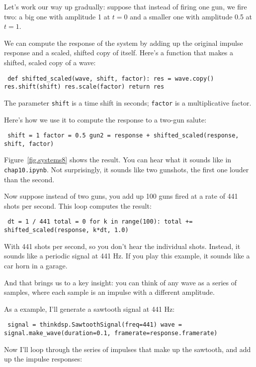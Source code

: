 \documentclass[12pt]{book} \usepackage[width=5.5in,height=8.5in, hmarginratio=3:2,vmarginratio=1:1]{geometry}
\begin{document}
Let's work our way up gradually: suppose that instead of firing one gun, we fire two: a big one with amplitude 1 at $t=0$ and a smaller one with amplitude 0.5 at $t=1$. 

We can compute the response of the system by adding up the original impulse response and a scaled, shifted copy of itself. Here's a function that makes a shifted, scaled copy of a wave: 

\begin{verbatim} def shifted_scaled(wave, shift, factor): res = wave.copy() res.shift(shift) res.scale(factor) return res \end{verbatim} 

The parameter {\tt shift} is a time shift in seconds; {\tt factor} is a multiplicative factor. 

Here's how we use it to compute the response to a two-gun salute: 

\begin{verbatim} shift = 1 factor = 0.5 gun2 = response + shifted_scaled(response, shift, factor) \end{verbatim} 

Figure~\ref{fig.systems8} shows the result. You can hear what it sounds like in {\tt chap10.ipynb}. Not surprisingly, it sounds like two gunshots, the first one louder than the second. 

Now suppose instead of two guns, you add up 100 guns fired at a rate of 441 shots per second. This loop computes the result: 

\begin{verbatim} dt = 1 / 441 total = 0 for k in range(100): total += shifted_scaled(response, k*dt, 1.0) \end{verbatim} 

With 441 shots per second, so you don't hear the individual shots. Instead, it sounds like a periodic signal at 441 Hz. If you play this example, it sounds like a car horn in a garage. 

And that brings us to a key insight: you can think of any wave as a series of samples, where each sample is an impulse with a different amplitude. 

As a example, I'll generate a sawtooth signal at 441 Hz: 

\begin{verbatim} signal = thinkdsp.SawtoothSignal(freq=441) wave = signal.make_wave(duration=0.1, framerate=response.framerate) \end{verbatim} 

Now I'll loop through the series of impulses that make up the sawtooth, and add up the impulse responses: 
\end{document}
